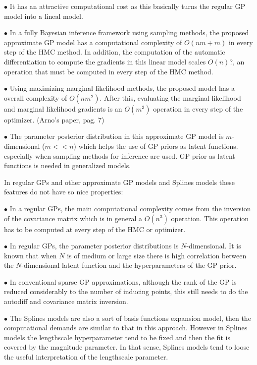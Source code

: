 \documentclass[]{interact}
\theoremstyle{plain}%
\theoremstyle{definition}
\theoremstyle{remark}
\begin{document}
\vspace{2mm}
$\bullet$ It has an attractive computational cost as this basically turns the regular GP model into a lineal model.

\vspace{2mm}
$\bullet$ In a fully Bayesian inference framework using sampling methods, the proposed approximate GP model has a computational complexity of $O(nm+m)$ in every step of the HMC method. In addition, the computation of the automatic differentiation to compute the gradients in this linear model scales $O(n)$?, an operation that must be computed in every step of the HMC method.

\vspace{2mm}
$\bullet$ Using maximizing marginal likelihood methods, the proposed model has a overall complexity of $O(nm^2)$. After this, evaluating the marginal likelihood and marginal likelihood gradients is an $O(m^3)$ operation in every step of the optimizer. (Arno's paper, pag. 7)

\vspace{2mm}
$\bullet$ The parameter posterior distribution in this approximate GP model is $m$-dimensional ($m<<n$) which helps the use of GP priors as latent functions. especially when sampling methods for inference are used. GP prior as latent functions is needed in generalized models.

In regular GPs and other approximate GP models and Splines models these features do not have so nice properties:

\vspace{2mm}
$\bullet$ In a regular GPs, the main computational complexity comes from the inversion of the covariance matrix which is in general a $O(n^3)$ operation. This operation has to be computed at every step of the HMC or optimizer.

\vspace{2mm}
$\bullet$ In regular GPs, the parameter posterior distributions is $N$-dimensional. It is known that when $N$ is of medium or large size there is high correlation between the $N$-dimensional latent function and the hyperparameters of the GP prior.

\vspace{2mm}
$\bullet$ In conventional sparse GP approximations, although the rank of the GP is reduced considerably to the number of inducing points, this still needs to do the autodiff and covariance matrix inversion.

\vspace{2mm}
$\bullet$ The Splines models are also a sort of basis functions expansion model, then the computational demands are similar to that in this approach. However in Splines models the lengthscale hyperparameter tend to be fixed and then the fit is covered by the magnitude parameter. In that sense, Splines models tend to loose the useful interpretation of the lengthscale parameter.
\end{document}
